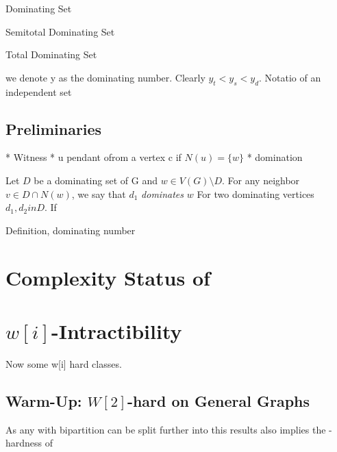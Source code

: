 Dominating Set

Semitotal Dominating Set

Total Dominating Set

we denote y as the dominating number. Clearly $y_t < y_s < y_d$.
Notatio of an independent set
\subsection{Preliminaries}

* Witness
* u pendant ofrom a vertex c if $N(u) = \{w\}$
* domination 

Let $D$ be a dominating set of G and $w \in V(G) \setminus D$. For any neighbor $v \in D \cap N(w)$, we say that $d_1$ \textit{dominates} $w$ For two dominating vertices $d_1, d_2in D$. If 

\sdom



Definition, dominating number

\section{Complexity Status of \sdom}\label{ch:complexity-status}

\section{\hmath $w[i]$-Intractibility}

Now some w[i] hard classes. 

\subsection{Warm-Up: \hmath $W[2]$-hard on General Graphs}


As any \bg with bipartition can be split further into \rpg this results also implies the \wone-hardness of \rpg

